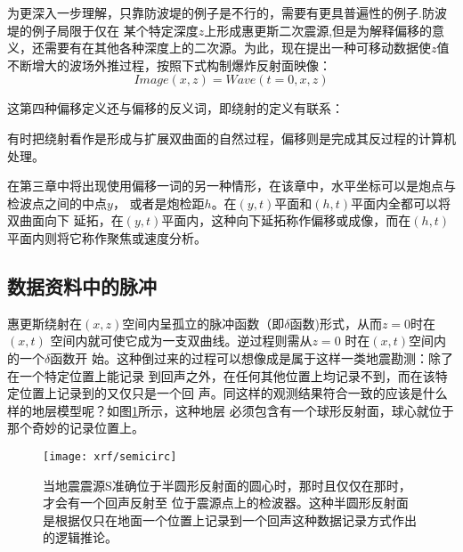 为更深入一步理解，只靠防波堤的例子是不行的，需要有更具普遍性的例子.防波堤的例子局限于仅在
某个特定深度$z$上形成惠更斯二次震源,但是为解释偏移的意义，还需要有在其他各种深度上的二次源。为此，现在提出一种可移动数据使$z$值不断增大的波场外推过程，按照下式构制爆炸反射面映像： 
\begin{equation}
Image(x,z)= Wave(t=0,x,z)
\label{eq:mig}
\end{equation}

这第四种偏移定义还与偏移的反义词，即绕射的定义有联系：


有时把绕射看作是形成与扩展双曲面的自然过程，偏移则是完成其反过程的计算机处理。


在第三章中将出现使用偏移一词的另一种情形，在该章中，水平坐标可以是炮点与检波点之间的中点$y$，
或者是炮检距$h$。在$(y,t)$平面和$(h,t)$平面内全都可以将双曲面向下
延拓，在$(y,t)$平面内，这种向下延拓称作偏移或成像，而在$(h,t)$平面内则将它称作聚焦或速度分析。


\subsection{数据资料中的脉冲}
惠更斯绕射在$(x,z)$空间内呈孤立的脉冲函数（即$\delta$函数)形式，从而$z=0$时在$(x,t)$
空间内就可使它成为一支双曲线。逆过程则需从$z=0$
时在$(x,t)$空间内的一个$\delta$函数开
始。这种倒过来的过程可以想像成是属于这样一类地震勘测：除了在一个特定位置上能记录
到回声之外，在任何其他位置上均记录不到，而在该特定位置上记录到的又仅只是一个回
声。同这样的观测结果符合一致的应该是什么样的地层模型呢？如图\ref{fig:xrf/semicirc}所示，这种地层
必须包含有一个球形反射面，球心就位于那个奇妙的记录位置上。
\begin{figure}[H]
\centering
\texttt{[image: xrf/semicirc]}
\caption[semicirc]{当地震震源S准确位于半圆形反射面的圆心时，那时且仅仅在那时，才会有一个回声反射至
位于震源点上的检波器。这种半圆形反射面是根据仅只在地面一个位置上记录到一个回声这种数据记录方式作出的逻辑推论。}
\label{fig:xrf/semicirc}
\end{figure}

